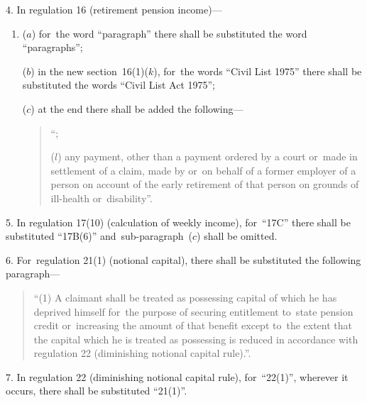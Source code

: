 \documentclass[12pt,a4paper]{article}
\begin{document}
4.  In regulation 16 (retirement pension income)—
\begin{enumerate}\item[]
($a$) for~the word “paragraph” there shall be substituted the word “paragraphs”;

($b$) in the new section~16(1)($k$), for~the words “Civil List 1975” there shall be substituted the words “Civil List Act 1975”;

($c$) at the end there shall be added the following—
\begin{quotation}
“;

($l$) any payment, other than a payment ordered by a court or~made in settlement of a claim, made by or~on behalf of a former employer of a person on account of the early retirement of that person on grounds of ill-health or~disability”.
\end{quotation}
\end{enumerate}

\medskip

5.  In regulation 17(10) (calculation of weekly income), for~“17C” there shall be substituted “17B(6)” and~sub-paragraph~($c$)  shall be omitted.

\medskip

6.  For~regulation 21(1) (notional capital), there shall be substituted the following paragraph—
\begin{quotation}
“(1) A claimant shall be treated as possessing capital of which he has deprived himself for~the purpose of securing entitlement to~state pension credit or~increasing the amount of that benefit except to~the extent that the capital which he is treated as possessing is reduced in accordance with regulation 22 (diminishing notional capital rule).”.
\end{quotation}

\medskip

7.  In regulation 22 (diminishing notional capital rule), for~“22(1)”, wherever it occurs, there shall be substituted “21(1)”.

\medskip
\end{document}
